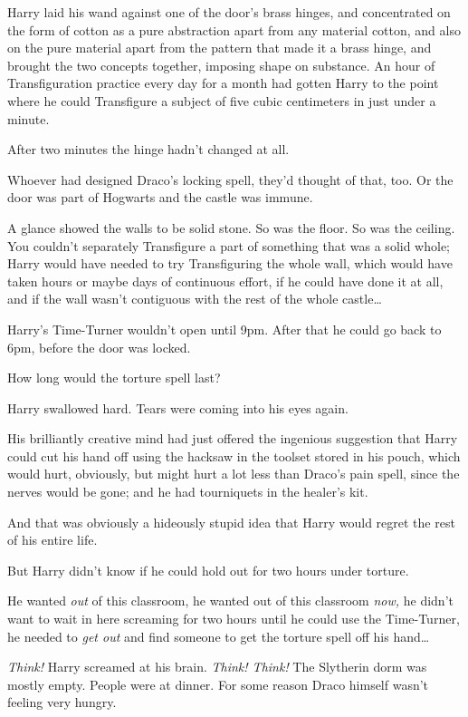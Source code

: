 Harry laid his wand against one of the door's brass hinges, and concentrated on
the form of cotton as a pure abstraction apart from any material cotton, and
also on the pure material apart from the pattern that made it a brass hinge,
and brought the two concepts together, imposing shape on substance. An hour of
Transfiguration practice every day for a month had gotten Harry to the point
where he could Transfigure a subject of five cubic centimeters in just under a
minute.

After two minutes the hinge hadn't changed at all.

Whoever had designed Draco's locking spell, they'd thought of that, too. Or the
door was part of Hogwarts and the castle was immune.

A glance showed the walls to be solid stone. So was the floor. So was the
ceiling. You couldn't separately Transfigure a part of something that was a
solid whole; Harry would have needed to try Transfiguring the whole wall, which
would have taken hours or maybe days of continuous effort, if he could have
done it at all, and if the wall wasn't contiguous with the rest of the whole
castle{\ldots}

Harry's Time-Turner wouldn't open until 9pm. After that he could go back to
6pm, before the door was locked.

How long would the torture spell last?

Harry swallowed hard. Tears were coming into his eyes again.

His brilliantly creative mind had just offered the ingenious suggestion that
Harry could cut his hand off using the hacksaw in the toolset stored in his
pouch, which would hurt, obviously, but might hurt a lot less than Draco's pain
spell, since the nerves would be gone; and he had tourniquets in the healer's
kit.

And that was obviously a hideously stupid idea that Harry would regret the rest
of his entire life.

But Harry didn't know if he could hold out for two hours under torture.

He wanted \emph{out} of this classroom, he wanted out of this classroom
\emph{now,} he didn't want to wait in here screaming for two hours until he
could use the Time-Turner, he needed to \emph{get out} and find someone to get
the torture spell off his hand{\ldots}

\emph{Think!} Harry screamed at his brain. \emph{Think! Think!}
\later
The Slytherin dorm was mostly empty. People were at dinner. For some reason
Draco himself wasn't feeling very hungry.

